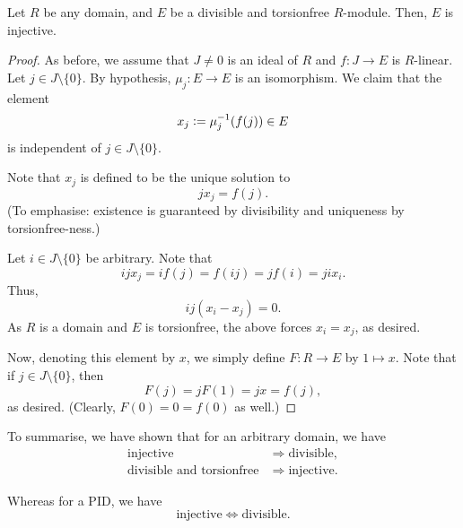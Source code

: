 \begin{prop} \label{prop:division-and-torsionfree-is-injective}
	Let $R$ be any domain, and $E$ be a divisible and torsionfree $R$-module. Then, $E$ is injective.
\end{prop}
\begin{proof} 
	As before, we assume that $J \neq 0$ is an ideal of $R$ and $f : J \to E$ is $R$-linear. Let $j \in J \setminus \{0\}$. By hypothesis, $\mu_{j} : E \to E$ is an isomorphism. We claim that the element
	\begin{equation*} 
		x_{j} \vcentcolon= \mu_{j}^{-1}(f(j)) \in E
	\end{equation*}
	is independent of $j \in J \setminus \{0\}$. 

	Note that $x_{j}$ is defined to be the unique solution to
	\begin{equation*} 
		j x_{j} = f(j).
	\end{equation*}
	(To emphasise: existence is guaranteed by divisibility and uniqueness by torsionfree-ness.)

	Let $i \in J \setminus \{0\}$ be arbitrary. Note that
	\begin{equation*} 
		ij x_{j} = i f(j) = f(ij) = j f(i) = ji x_{i}.
	\end{equation*}
	Thus,
	\begin{equation*} 
		ij (x_{i} - x_{j}) = 0.
	\end{equation*}
	As $R$ is a domain and $E$ is torsionfree, the above forces $x_{i} = x_{j}$, as desired.

	Now, denoting this element by $x$, we simply define $F : R \to E$ by $1 \mapsto x$. Note that if $j \in J \setminus \{0\}$, then
	\begin{equation*} 
		F(j) = j F(1) = jx = f(j),
	\end{equation*}
	as desired. (Clearly, $F(0) = 0 = f(0)$ as well.)
\end{proof}

\begin{rem}
	To summarise, we have shown that for an arbitrary domain, we have
	\begin{align*} 
		\text{injective} &\Rightarrow \text{divisible}, \\
		\text{divisible and torsionfree} &\Rightarrow \text{injective}.
	\end{align*}

	Whereas for a PID, we have
	\begin{equation*} 
		\text{injective} \Leftrightarrow \text{divisible}.
	\end{equation*}
\end{rem}

